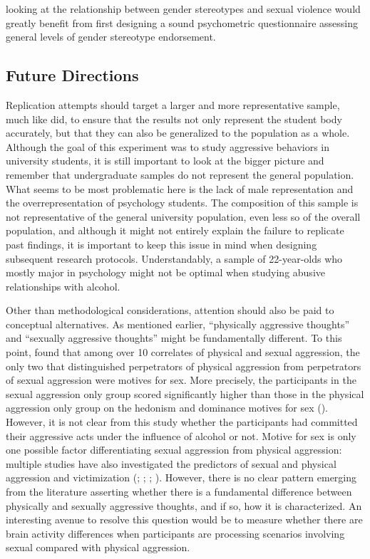 \documentclass[serif, twocolumn, numeric, empirical]{jote-article}
\begin{document}
looking at the relationship between gender stereotypes and sexual violence would greatly benefit from first designing a sound psychometric questionnaire assessing general levels of gender stereotype endorsement.  

{}
\subsection*{Future Directions }
Replication attempts should target a larger and more representative sample, much like \textcite{SubraMullerBegueLBushmanDelmas2010} did, to ensure that the results not only represent the student body accurately, but that they can also be generalized to the population as a whole. Although the goal of this experiment was to study aggressive behaviors in university students, it is still important to look at the bigger picture and remember that undergraduate samples do not represent the general population. What seems to be most problematic here is the lack of male representation and the overrepresentation of psychology students. The composition of this sample is not representative of the general university population, even less so of the overall population, and although it might not entirely explain the failure to replicate past findings, it is important to keep this issue in mind when designing subsequent research protocols. Understandably, a sample of 22-year-olds who mostly major in psychology might not be optimal when studying abusive relationships with alcohol. 

Other than methodological considerations, attention should also be paid to conceptual alternatives. As mentioned earlier, ``physically aggressive thoughts”  and ``sexually aggressive thoughts”  might be fundamentally different. To this point, \textcite{WhiteMcMullinSwartoutSechristGollehon2008} found that among over 10 correlates of physical and sexual aggression, the only two that distinguished perpetrators of physical aggression from perpetrators of sexual aggression were motives for sex. More precisely, the participants in the sexual aggression only group scored significantly higher than those in the physical aggression only group on the hedonism and dominance motives for sex (\cite{WhiteMcMullinSwartoutSechristGollehon2008}). However, it is not clear from this study whether the participants had committed their aggressive acts under the influence of alcohol or not. Motive for sex is only one possible factor differentiating sexual aggression from physical aggression: multiple studies have also investigated the predictors of sexual and physical aggression and victimization (\cite{ZawackiAbbeyBuckMcAuslanClintonSherrodA2003}; \cite{JamesYoung2013}; \cite{GidyczWarkentinOrchowski2007}; \cite{FelsonBurchfield2004}). However, there is no clear pattern emerging from the literature asserting whether there is a fundamental difference between physically and sexually aggressive thoughts, and if so, how it is characterized. An interesting avenue to resolve this question would be to measure whether there are brain activity differences when participants are processing scenarios involving sexual compared with physical aggression. 
\end{document}
